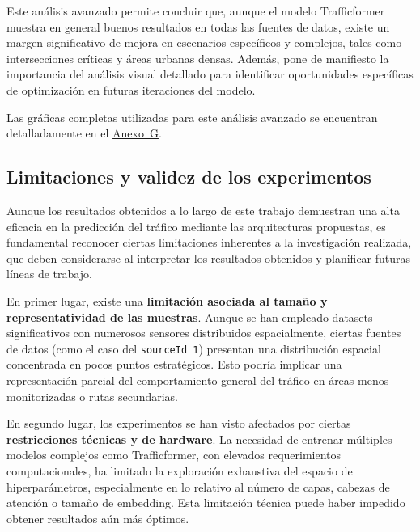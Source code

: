 Este análisis avanzado permite concluir que, aunque el modelo Trafficformer muestra en general buenos resultados en todas las fuentes de datos, existe un margen significativo de mejora en escenarios específicos y complejos, tales como intersecciones críticas y áreas urbanas densas. Además, pone de manifiesto la importancia del análisis visual detallado para identificar oportunidades específicas de optimización en futuras iteraciones del modelo.

Las gráficas completas utilizadas para este análisis avanzado se encuentran detalladamente en el \hyperref[anexo:analisis_avanzado]{Anexo~G}.


\subsection{Limitaciones y validez de los experimentos}
\label{sec:limitaciones_validez}

Aunque los resultados obtenidos a lo largo de este trabajo demuestran una alta eficacia en la predicción del tráfico mediante las arquitecturas propuestas, es fundamental reconocer ciertas limitaciones inherentes a la investigación realizada, que deben considerarse al interpretar los resultados obtenidos y planificar futuras líneas de trabajo.

En primer lugar, existe una \textbf{limitación asociada al tamaño y representatividad de las muestras}. Aunque se han empleado datasets significativos con numerosos sensores distribuidos espacialmente, ciertas fuentes de datos (como el caso del \texttt{sourceId 1}) presentan una distribución espacial concentrada en pocos puntos estratégicos. Esto podría implicar una representación parcial del comportamiento general del tráfico en áreas menos monitorizadas o rutas secundarias.

En segundo lugar, los experimentos se han visto afectados por ciertas \textbf{restricciones técnicas y de hardware}. La necesidad de entrenar múltiples modelos complejos como Trafficformer, con elevados requerimientos computacionales, ha limitado la exploración exhaustiva del espacio de hiperparámetros, especialmente en lo relativo al número de capas, cabezas de atención o tamaño de embedding. Esta limitación técnica puede haber impedido obtener resultados aún más óptimos.

